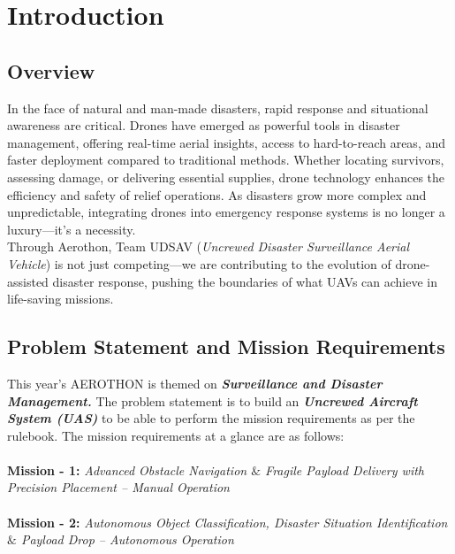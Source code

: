 \documentclass[12pt]{report}
\begin{document}
  \tableofcontents
  \newpage


  \chapter{Introduction}
  \section{Overview}

   In the face of natural and man-made disasters, rapid response and situational awareness are critical. Drones have emerged as powerful tools in disaster management, offering real-time aerial insights, access to hard-to-reach areas, and faster deployment compared to traditional methods. Whether locating survivors, assessing damage, or delivering essential supplies, drone technology enhances the efficiency and safety of relief operations. As disasters grow more complex and unpredictable, integrating drones into emergency response systems is no longer a luxury—it's a necessity. \\ 

   Through Aerothon, Team UDSAV (\textit{Uncrewed Disaster Surveillance Aerial Vehicle}) is not just competing—we are contributing to the evolution of drone-assisted disaster response, pushing the boundaries of what UAVs can achieve in life-saving missions.

    \section{Problem Statement and Mission Requirements}
    This year's AEROTHON is themed on \textbf{\textit{Surveillance and Disaster Management.}} The problem statement is to build an \textbf{\textit{Uncrewed Aircraft System (UAS)}} to be able to perform the mission requirements as per the rulebook. The mission requirements at a glance are as follows: \\ \\
    \textbf{Mission - 1:} \textit{Advanced Obstacle Navigation $\&$ Fragile Payload Delivery with Precision Placement – Manual Operation} \\ \\
    \textbf{Mission - 2:} \textit{Autonomous Object Classification, Disaster Situation Identification $\&$ Payload Drop – Autonomous Operation} 
\end{document}

